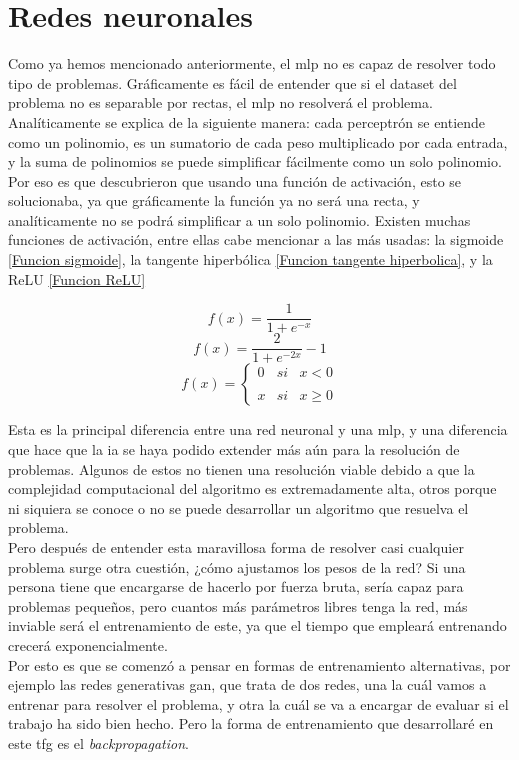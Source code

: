 \section{Redes neuronales}
\label{Redes Neuronales}
Como ya hemos mencionado anteriormente, el \gls{mlp} no es capaz de resolver todo tipo de problemas. Gráficamente es fácil de entender que si el dataset del problema no es separable por rectas, el \gls{mlp} no resolverá el problema. Analíticamente se explica de la siguiente manera: cada perceptrón se entiende como un polinomio, es un sumatorio de cada peso multiplicado por cada entrada, y la suma de polinomios se puede simplificar fácilmente como un solo polinomio. Por eso es que descubrieron que usando una función de activación, esto se solucionaba, ya que gráficamente la función ya no será una recta, y analíticamente no se podrá simplificar a un solo polinomio.
Existen muchas funciones de activación, entre ellas cabe mencionar a las más usadas: la sigmoide \ref{Funcion sigmoide}, la tangente hiperbólica \ref{Funcion tangente hiperbolica}, y la ReLU \ref{Funcion ReLU}

\begin{equation}
	\label{Funcion sigmoide}
	f(x) =  \frac{\mathrm{1} }{\mathrm{1} + e^{-x} }
\end{equation}
\begin{equation}
	\label{Funcion tangente hiperbolica}
	f(x) =  \frac{\mathrm{2} }{\mathrm{1} + e^{-2x} }  - 1
\end{equation}
\begin{equation}
	\label{Funcion ReLU}
	f(x)= \left\{ \begin{array}{lcc}
		0 &   si  & x < 0 \\
		\\ x &  si  & x \geq 0
	\end{array}
	\right.
\end{equation}

Esta es la principal diferencia entre una red neuronal y una \gls{mlp}, y una diferencia que hace que la \gls{ia} se haya podido extender más aún para la resolución de problemas. Algunos de estos no tienen una resolución viable debido a que la complejidad computacional del algoritmo es extremadamente alta, otros porque ni siquiera se conoce o no se puede desarrollar un algoritmo que resuelva el problema. 
\\
Pero después de entender esta maravillosa forma de resolver casi cualquier problema surge otra cuestión, ¿cómo ajustamos los pesos de la red? Si una persona tiene que encargarse de hacerlo por fuerza bruta, sería capaz para problemas pequeños, pero cuantos más parámetros libres tenga la red, más inviable será el entrenamiento de este, ya que el tiempo que empleará entrenando crecerá exponencialmente.
\\
Por esto es que se comenzó a pensar en formas de entrenamiento alternativas, por ejemplo las redes generativas \gls{gan}, que trata de dos redes, una la cuál vamos a entrenar para resolver el problema, y otra la cuál se va a encargar de evaluar si el trabajo ha sido bien hecho. Pero la forma de entrenamiento que desarrollaré en este \gls{tfg} es el \textit{backpropagation}.

